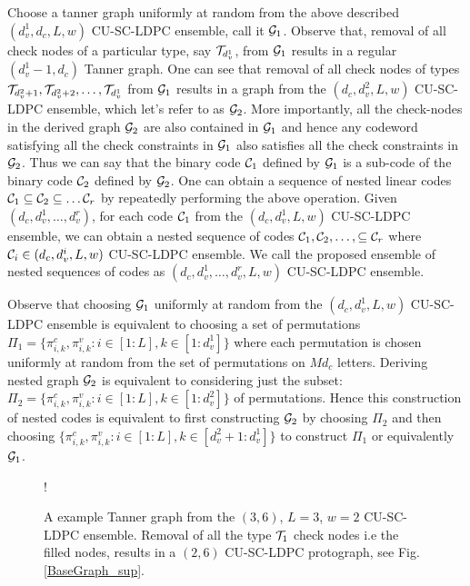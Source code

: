 \documentclass[journal,twocolumn]{IEEEtran}
\begin{document}
Choose a tanner graph uniformly at random from the above described $(d_{v}^{1},d_{c},L,w)$ CU-SC-LDPC ensemble, call it $\mathcal{G}_{1}$. Observe that, removal of all check nodes of a particular type, say $\mathcal{T}_{d_{v}^{1}}$, from $\mathcal{G}_{1}$ results in a regular $(d_{v}^{1}-1,d_{c})$ Tanner graph. One can see that removal of all check nodes of types $\mathcal{T}_{d_{v}^{2}+1},\mathcal{T}_{d_{v}^{2}+2},\ldots, \mathcal{T}_{d_{v}^1} $ from $\mathcal{G}_{1}$ results in a graph from the $(d_{c},d_{v}^{2},L,w)$ CU-SC-LDPC ensemble, which let's refer to as $\mathcal{G}_{2}$. More importantly, all the check-nodes in the derived graph $\mathcal{G}_{2}$ are also contained in $\mathcal{G}_{1}$ and hence any codeword satisfying all the check constraints in $\mathcal{G}_{1}$ also satisfies all the check constraints in $\mathcal{G}_{2}$. Thus we can say that the binary code $\mathcal{C}_{1}$ defined by $\mathcal{G}_{1}$ is a sub-code of the binary code $\mathcal{C}_{2}$ defined by $\mathcal{G}_{2}$. One can obtain a sequence of nested linear codes $\mathcal{C}_1\subseteq\mathcal{C}_2\subseteq\ldots\mathcal{C}_r$ by repeatedly performing the above operation. Given $(d_{c},d_{v}^{1},\ldots,d_{v}^{r})$, for each code $\mathcal{C}_{1}$ from the $(d_{c},d_{v}^{1},L,w)$ CU-SC-LDPC ensemble, we can obtain a nested sequence of codes $\mathcal{C}_1,\mathcal{C}_2,\ldots,\subseteq\mathcal{C}_r$ where $\mathcal{C}_{i} \in (d_{c},d_{v}^{i},L,w)$ CU-SC-LDPC ensemble.  We call the proposed ensemble of nested sequences of codes as $(d_{c},d_{v}^{1},\ldots,d_{v}^{r},L,w)$ CU-SC-LDPC ensemble. 

\begin{Remark}\label{Rmk:EquivNestedConstr1}
Observe that choosing $\mathcal{G}_{1}$ uniformly at random from the $(d_{c},d_{v}^{1},L,w)$ CU-SC-LDPC ensemble is equivalent to choosing a set of permutations $\Pi_{1}=\{\pi_{i,k}^{c},\pi_{i,k}^{v}: i\in[1:L],k\in[1:d_{v}^{1}]\}$ where each permutation is chosen uniformly at random from the set of permutations on $Md_{c}$ letters. Deriving nested graph $\mathcal{G}_{2}$ is equivalent to considering just the subset: $\Pi_{2}=\{\pi_{i,k}^{c},\pi_{i,k}^{v}: i\in[1:L],k\in[1:d_{v}^{2}]\}$ of permutations. Hence this construction of nested codes is equivalent to first constructing $\mathcal{G}_{2}$ by choosing $\Pi_{2}$ and then choosing $\{\pi_{i,k}^{c},\pi_{i,k}^{v}: i\in[1:L], k\in[d_{v}^{2}+1:d_{v}^{1}]\}$ to construct $\Pi_{1}$ or equivalently $\mathcal{G}_{1}$.
\end{Remark}

\begin{figure}[t]
\centering
\resizebox {\columnwidth} {!} {

}
\caption{A example Tanner graph from the $(3,6)$, $L=3$, $w=2$ CU-SC-LDPC ensemble. Removal of all the type $\mathcal{T}_{1}$ check nodes i.e the filled nodes, results in a $(2,6)$ CU-SC-LDPC protograph, see Fig.\ref{BaseGraph_sup}. }
\label{Basegraph}
\end{figure}
\end{document}
